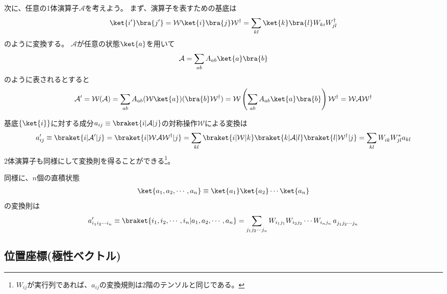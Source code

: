 \documentclass[11pt]{easymemo}
\begin{document}
次に、任意の1体演算子$\mathcal{A}$を考えよう。
まず、演算子を表すための基底は
\begin{align}
\ket{i'}\bra{j'}=\mathcal{W}\ket{i}\bra{j}\mathcal{W}^{\dagger}=\sum_{kl}\ket{k}\bra{l}W_{ki}W_{jl}^{\dagger}
\end{align}
のように変換する。
$\mathcal{A}$が任意の状態$\ket{a}$を用いて
\begin{align}
  \mathcal{A}=\sum_{ab}A_{ab}\ket{a}\bra{b}
\end{align}
のように表されるとすると
\begin{align}
  \mathcal{A}'
  =\mathcal{W}(\mathcal{A})=\sum_{ab}A_{ab}(\mathcal{W}\ket{a})(\bra{b}\mathcal{W}^{\dagger})
  =\mathcal{W}\left(\sum_{ab}A_{ab}\ket{a}\bra{b}\right)\mathcal{W}^{\dagger}
  =\mathcal{W}\mathcal{A}\mathcal{W}^{\dagger}
\end{align}

基底$\{\ket{i}\}$に対する成分$a_{ij}\equiv\braket{i|\mathcal{A}|j}$の対称操作$\mathcal{W}$による変換は
\begin{align}
  a_{ij}'\equiv\braket{i|\mathcal{A}'|j}
  =\braket{i|\mathcal{W}^{}\mathcal{A}\mathcal{W}^{\dagger}|j}
  =\sum_{kl}\braket{i|\mathcal{W}^{}|k}\braket{k|\mathcal{A}|l}\braket{l|\mathcal{W}^{\dagger}|j}
  =\sum_{kl}W_{ik}^{}W_{jl}^{*}a_{kl}
\label{eq:65}
\end{align}
2体演算子も同様にして変換則を得ることができる\footnote{$W_{ij}$が実行列であれば、$a_{ij}$の変換規則は2階のテンソルと同じである。}。

同様に、$n$個の直積状態
\begin{align}
  \ket{a_{1},a_{2},\cdots,a_{n}}
  \equiv \ket{a_{1}}\ket{a_{2}}\cdots\ket{a_{n}}
\end{align}
の変換則は
\begin{align}
  a_{i_{1}i_{2}\cdots i_{n}}'\equiv \braket{i_{1},i_{2},\cdots,i_{n}|a_{1},a_{2},\cdots,a_{n}}=\sum_{j_{1}j_{2}\cdots j_{n}}W_{i_{1}j_{1}}W_{i_{2}j_{2}}
  \cdots W_{i_{n}j_{n}}\,a_{j_{1}j_{2}\cdots j_{n}}^{}
\end{align}


\subsection{位置座標(極性ベクトル)}
\end{document}
